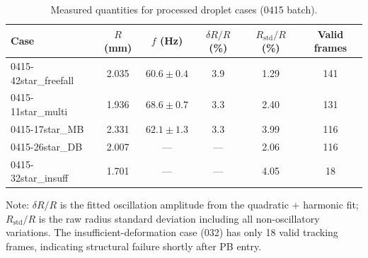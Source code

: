 \documentclass[%
 preprint,
 superscriptaddress,
 amsmath,amssymb,
 aps, prl,
]{revtex4-2}
\begin{document}
\begin{table}[ht]
\caption{Measured quantities for processed droplet cases (0415 batch).}
\label{tab:experimental}
\begin{ruledtabular}
\begin{tabular}{lccccc}
\textbf{Case} & $R$ (mm) & $f$ (Hz) & $\delta R/R$ (\%) &
$R_{\text{std}}/R$ (\%) & Valid frames \\
\hline
0415-42star\_freefall & 2.035 & $60.6\pm0.4$ & 3.9 & 1.29 & 141 \\
0415-11star\_multi    & 1.936 & $68.6\pm0.7$ & 3.3 & 2.40 & 131 \\
0415-17star\_MB       & 2.331 & $62.1\pm1.3$ & 3.3 & 3.99 & 116 \\
0415-26star\_DB       & 2.007 & --- & --- & 2.06 & 116 \\
0415-32star\_insuff   & 1.701 & --- & --- & 4.05 & 18 \\
\hline
\end{tabular}
\end{ruledtabular}
\end{table}

Note: $\delta R/R$ is the fitted oscillation amplitude from the quadratic $+$ harmonic fit; $R_{\text{std}}/R$ is the raw radius standard deviation including all non-oscillatory variations. The insufficient-deformation case (032) has only 18 valid tracking frames, indicating structural failure shortly after PB entry.\par
\end{document}
